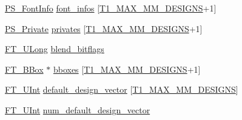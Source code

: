 \begin{DoxyCompactItemize}
\item 
\hyperlink{t1tables_8h_a413d5f096543f289c85f416f688ffc06}{P\-S\-\_\-\-Font\-Info} \hyperlink{struct_p_s___blend_rec___ac5478cafc838257e693a9604edf1f5e9}{font\-\_\-infos} \mbox{[}\hyperlink{t1tables_8h_a933ca229674aa312fd5546fadc95e08f}{T1\-\_\-\-M\-A\-X\-\_\-\-M\-M\-\_\-\-D\-E\-S\-I\-G\-N\-S}+1\mbox{]}
\item 
\hyperlink{t1tables_8h_af13eae0f58324d685b24cd4079c01c7e}{P\-S\-\_\-\-Private} \hyperlink{struct_p_s___blend_rec___a2b6e0c48d7a9c350b09f2943c1779ea4}{privates} \mbox{[}\hyperlink{t1tables_8h_a933ca229674aa312fd5546fadc95e08f}{T1\-\_\-\-M\-A\-X\-\_\-\-M\-M\-\_\-\-D\-E\-S\-I\-G\-N\-S}+1\mbox{]}
\item 
\hyperlink{fttypes_8h_a4fac88bdba78eb76b505efa6e4fbf3f5}{F\-T\-\_\-\-U\-Long} \hyperlink{struct_p_s___blend_rec___a86caa5319e208b4a2057db656bad9221}{blend\-\_\-bitflags}
\item 
\hyperlink{ftimage_8h_ae341c4eb5a7199947a13b2a1dcaf7af7}{F\-T\-\_\-\-B\-Box} $\ast$ \hyperlink{struct_p_s___blend_rec___a30845d3cbd2e95a5f9cc867c7226af5e}{bboxes} \mbox{[}\hyperlink{t1tables_8h_a933ca229674aa312fd5546fadc95e08f}{T1\-\_\-\-M\-A\-X\-\_\-\-M\-M\-\_\-\-D\-E\-S\-I\-G\-N\-S}+1\mbox{]}
\item 
\hyperlink{fttypes_8h_abcb8db4dbf35d2b55a9e8c7b0926dc52}{F\-T\-\_\-\-U\-Int} \hyperlink{struct_p_s___blend_rec___a3ddacbda91fe0f9ef934a9e0afa6286f}{default\-\_\-design\-\_\-vector} \mbox{[}\hyperlink{t1tables_8h_a933ca229674aa312fd5546fadc95e08f}{T1\-\_\-\-M\-A\-X\-\_\-\-M\-M\-\_\-\-D\-E\-S\-I\-G\-N\-S}\mbox{]}
\item 
\hyperlink{fttypes_8h_abcb8db4dbf35d2b55a9e8c7b0926dc52}{F\-T\-\_\-\-U\-Int} \hyperlink{struct_p_s___blend_rec___afa5c7dd4206eb8a1d9ef4894abfc9555}{num\-\_\-default\-\_\-design\-\_\-vector}
\end{DoxyCompactItemize}


